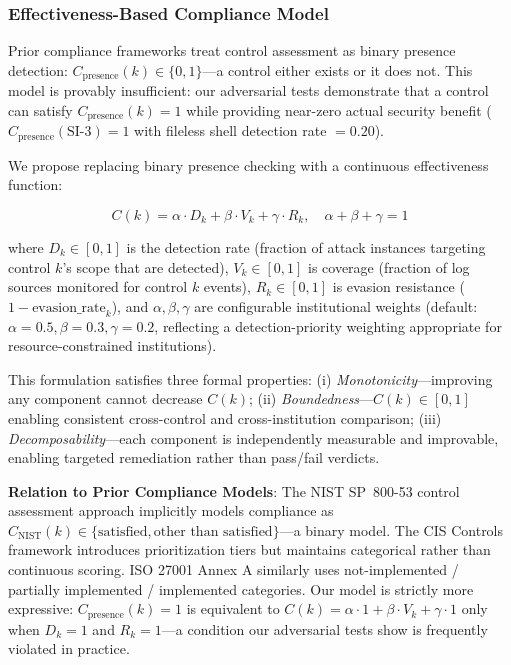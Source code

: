 \documentclass[futureinternet,article,submit,pdftex,moreauthors]{Definitions/mdpi}
\begin{document}
\subsubsection{Effectiveness-Based Compliance Model}

Prior compliance frameworks treat control assessment as binary presence detection:
$C_{\text{presence}}(k) \in \{0, 1\}$---a control either exists or it does not. This model
is provably insufficient: our adversarial tests demonstrate that a control can satisfy
$C_{\text{presence}}(k) = 1$ while providing near-zero actual security benefit
($C_{\text{presence}}(\text{SI-3}) = 1$ with fileless shell detection rate $= 0.20$).

We propose replacing binary presence checking with a continuous effectiveness function:
\begin{linenomath}
\begin{equation}
C(k) = \alpha \cdot D_k + \beta \cdot V_k + \gamma \cdot R_k, \quad \alpha + \beta + \gamma = 1
\label{eq:compliance}
\end{equation}
\end{linenomath}
where $D_k \in [0,1]$ is the detection rate (fraction of attack instances targeting control
$k$'s scope that are detected), $V_k \in [0,1]$ is coverage (fraction of log sources
monitored for control $k$ events), $R_k \in [0,1]$ is evasion resistance
($1 - \text{evasion\_rate}_k$), and $\alpha, \beta, \gamma$ are configurable institutional
weights (default: $\alpha = 0.5, \beta = 0.3, \gamma = 0.2$, reflecting a detection-priority
weighting appropriate for resource-constrained institutions).

This formulation satisfies three formal properties: (i) \textit{Monotonicity}---improving any
component cannot decrease $C(k)$; (ii) \textit{Boundedness}---$C(k) \in [0,1]$ enabling
consistent cross-control and cross-institution comparison; (iii) \textit{Decomposability}---each
component is independently measurable and improvable, enabling targeted remediation rather
than pass/fail verdicts.

\textbf{Relation to Prior Compliance Models}: The NIST SP~800-53 control assessment approach
implicitly models compliance as $C_{\text{NIST}}(k) \in \{\text{satisfied}, \text{other than
satisfied}\}$---a binary model. The CIS Controls framework introduces prioritization tiers but
maintains categorical rather than continuous scoring. ISO 27001 Annex A similarly uses
not-implemented / partially implemented / implemented categories. Our model is strictly more
expressive: $C_{\text{presence}}(k) = 1$ is equivalent to $C(k) = \alpha \cdot 1 + \beta \cdot
V_k + \gamma \cdot 1$ only when $D_k = 1$ and $R_k = 1$---a condition our adversarial tests
show is frequently violated in practice.
\end{document}
